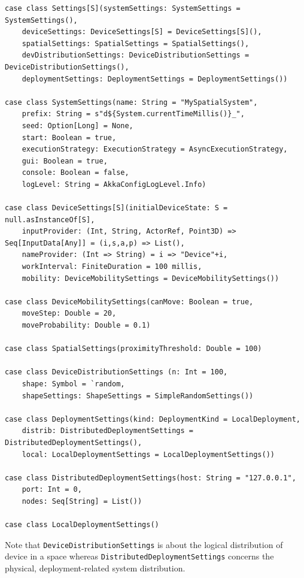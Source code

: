 \documentclass[11pt]{llncs}
\begin{document}
\begin{lstlisting}[basicstyle=\ttfamily\scriptsize,emph={Settings,DeviceDistributionSettings,DeviceMobilitySettings,DeviceSettings,SpatialSettings,SystemSettings,DeploymentSettings},emphstyle=\textbf]
case class Settings[S](systemSettings: SystemSettings = SystemSettings(),
    deviceSettings: DeviceSettings[S] = DeviceSettings[S](),
    spatialSettings: SpatialSettings = SpatialSettings(),
    devDistributionSettings: DeviceDistributionSettings = DeviceDistributionSettings(),
    deploymentSettings: DeploymentSettings = DeploymentSettings())

case class SystemSettings(name: String = "MySpatialSystem",
    prefix: String = s"d${System.currentTimeMillis()}_",
    seed: Option[Long] = None,
    start: Boolean = true,
    executionStrategy: ExecutionStrategy = AsyncExecutionStrategy,
    gui: Boolean = true,
    console: Boolean = false,
    logLevel: String = AkkaConfigLogLevel.Info)

case class DeviceSettings[S](initialDeviceState: S = null.asInstanceOf[S],
    inputProvider: (Int, String, ActorRef, Point3D) => Seq[InputData[Any]] = (i,s,a,p) => List(),
    nameProvider: (Int => String) = i => "Device"+i,
    workInterval: FiniteDuration = 100 millis,
    mobility: DeviceMobilitySettings = DeviceMobilitySettings())

case class DeviceMobilitySettings(canMove: Boolean = true,
    moveStep: Double = 20,
    moveProbability: Double = 0.1)

case class SpatialSettings(proximityThreshold: Double = 100)

case class DeviceDistributionSettings (n: Int = 100,
    shape: Symbol = `random,
    shapeSettings: ShapeSettings = SimpleRandomSettings())

case class DeploymentSettings(kind: DeploymentKind = LocalDeployment,
    distrib: DistributedDeploymentSettings = DistributedDeploymentSettings(),
    local: LocalDeploymentSettings = LocalDeploymentSettings())

case class DistributedDeploymentSettings(host: String = "127.0.0.1",
    port: Int = 0,
    nodes: Seq[String] = List())

case class LocalDeploymentSettings()
\end{lstlisting}

Note that \texttt{DeviceDistributionSettings} is about the logical distribution of device in a space whereas \texttt{DistributedDeploymentSettings} concerns the physical, deployment-related system distribution.
\end{document}
